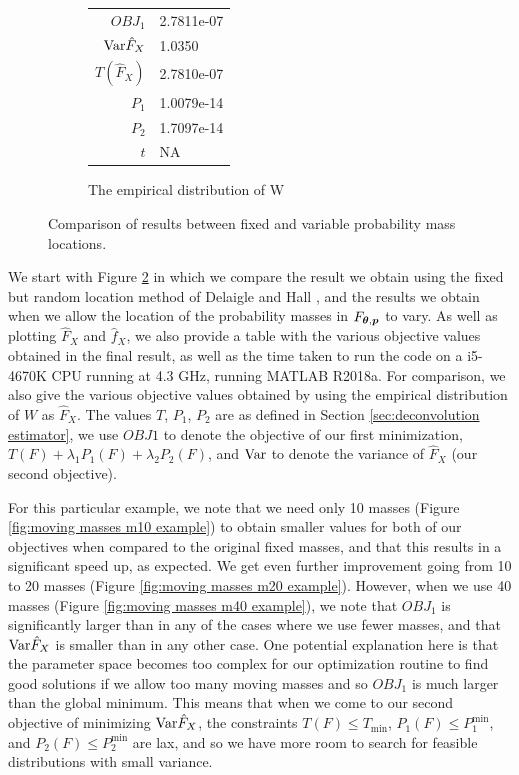 \begin{figure}
\begin{subfigure}[b]{0.49\textwidth}
		\begin{tabular}{r l}
			$OBJ_1$ & 2.7811e-07\\
			$\mathrm{Var} \hat{F}_X$ & 1.0350\\
			$T(\hat{F}_X)$ & 2.7810e-07\\
			$P_1$ & 1.0079e-14\\
			$P_2$ & 1.7097e-14\\
			$t$ & NA
		\end{tabular}
		\caption{The empirical distribution of W}
		\label{fig:emp masses example}
	\end{subfigure}
	
	\caption{Comparison of results between fixed and variable probability mass locations.}
	\label{fig:compare fixed moving masses}
\end{figure}

We start with Figure \ref{fig:compare fixed moving masses} in which we compare the result we obtain using the fixed but random location method of Delaigle and Hall \cite{Delaigle2016-la}, and the results we obtain when we allow the location of the probability masses in $F_{{\bm{{\theta}}}, {\bm{{p}}}}$ to vary. As well as plotting $\hat{F}_X$ and $\hat{f}_X$, we also provide a table with the various objective values obtained in the final result, as well as the time taken to run the code on a i5-4670K CPU running at 4.3 GHz, running MATLAB R2018a. For comparison, we also give the various objective values obtained by using the empirical distribution of $W$ as $\hat{F}_X$. The values $T$, $P_1$, $P_2$ are as defined in Section \ref{sec:deconvolution estimator}, we use $OBJ1$ to denote the objective of our first minimization, $T(F) + \lambda_1 P_1(F) + \lambda_2 P_2(F)$, and $\mathrm{Var}$ to denote the variance of $\hat{F}_X$ (our second objective).

For this particular example, we note that we need only 10 masses (Figure \ref{fig:moving masses m10 example}) to obtain smaller values for both of our objectives when compared to the original fixed masses, and that this results in a significant speed up, as expected. We get even further improvement going from 10 to 20 masses (Figure \ref{fig:moving masses m20 example}). However, when we use 40 masses (Figure \ref{fig:moving masses m40 example}), we note that $OBJ_1$ is significantly larger than in any of the cases where we use fewer masses, and that $\mathrm{Var}\hat{F}_X$ is smaller than in any other case. One potential explanation here is that the parameter space becomes too complex for our optimization routine to find good solutions if we allow too many moving masses and so $OBJ_1$ is much larger than the global minimum. This means that when we come to our second objective of minimizing $\mathrm{Var} \hat{F}_X$, the constraints $T(F) \leq T_\mathrm{min}$, $P_1(F) \leq P_1^\mathrm{min}$, and $P_2(F) \leq P_2^\mathrm{min}$ are lax, and so we have more room to search for feasible distributions with small variance.

